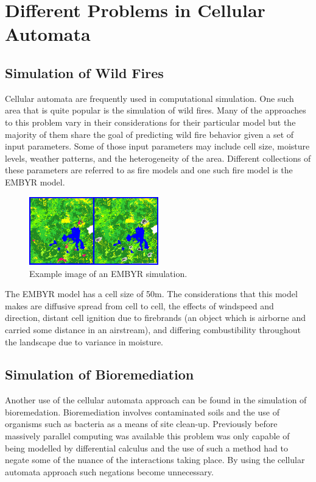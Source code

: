 \documentclass[12pt]{article}
\begin{document}
\par
\section{Different Problems in Cellular Automata}
\subsection{Simulation of Wild Fires}
Cellular automata are frequently used in computational simulation. One such area that is quite popular is the simulation of wild fires. Many of the approaches to this problem vary in their considerations for their  particular model but the majority of them share the goal of predicting wild fire behavior given a set of input parameters. Some of those input parameters may include cell size, moisture levels, weather patterns, and the heterogeneity of the area. Different collections of these parameters are referred to as fire models and one such fire model is the EMBYR model. 

\begin{figure}[h]
\centering
\includegraphics[width=0.5\textwidth]{embyr.PNG}
\caption{\label{fig:Fire}Example image of an EMBYR simulation.}
\end{figure}

\par
The EMBYR model has a cell size of 50m. The considerations that this model makes are diffusive spread from cell to cell, the effects of windspeed and direction, distant cell ignition due to firebrands (an object which is airborne and carried some distance in an airstream), and differing combustibility throughout the landscape due to variance in moisture.\cite{HARGROVE2000243}

\subsection{Simulation of Bioremediation}
Another use of the cellular automata approach can be found in the simulation of bioremedation. Bioremediation involves contaminated soils and the use of organisms such as bacteria as a means of site clean-up. Previously before massively parallel computing was available this problem was only capable of being modelled by differential calculus and the use of such a method had to negate some of the nuance of the interactions taking place. By using the cellular automata approach such negations become unnecessary.\cite{Gregorio96aparallel}
\end{document}
